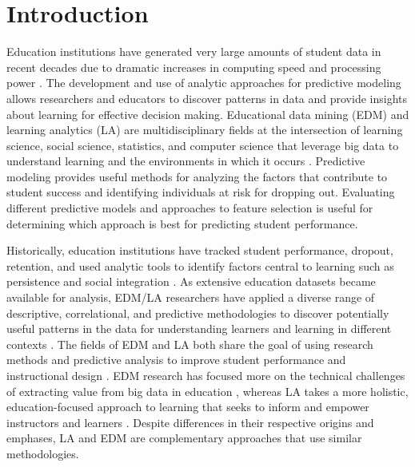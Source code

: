 \documentclass[sigconf]{acmart}
\begin{document}
\section{Introduction}

Education institutions have generated very large amounts of student data in 
recent decades due to dramatic increases in computing speed and processing power 
\cite{daniel15, daniel16}. The development and use of analytic approaches for 
predictive modeling allows researchers and educators to discover patterns in 
data and provide insights about learning for effective decision making. 
Educational data mining (EDM) and learning analytics (LA) are multidisciplinary 
fields at the intersection of learning science, social science, statistics, and 
computer science that leverage big data to understand learning and the 
environments in which it occurs \cite{siemens13, siemensbaker12}. Predictive 
modeling provides useful methods for analyzing the factors that contribute to 
student success and identifying individuals at risk for dropping out. 
Evaluating different predictive models and approaches to feature selection is 
useful for determining which approach is best for predicting student performance. 


Historically, education institutions have tracked student performance, 
dropout, retention, and used analytic tools to identify factors central 
to learning such as persistence and social integration \cite{ferguson12}. 
As extensive education datasets became available for analysis, EDM/LA 
researchers have applied a diverse range of descriptive, correlational, and 
predictive methodologies to discover potentially useful patterns in the data 
for understanding learners and learning in different contexts \cite{siemens11}. 
The fields of EDM and LA both share the goal of using research methods and
predictive analysis to improve student performance and instructional design 
\cite{baker09, ferguson12, lester19}. EDM research has focused more on the 
technical challenges of extracting value from big data in education 
\cite{penaAyala14, romero10}, whereas LA takes a more holistic, education-focused 
approach to learning that seeks to inform and empower instructors and 
learners \cite{lang17, papamitsiou14}. Despite differences in their respective 
origins and emphases, LA and EDM are complementary approaches that use similar 
methodologies. 
\end{document}

